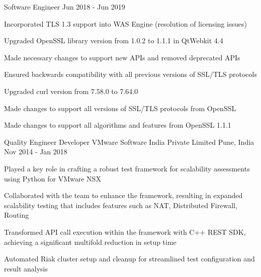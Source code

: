 \begin{cventries}
\cventry
{Software Engineer} %
{} %
{} %
{Jun 2018 - Jun 2019} %
{
\begin{cvitems}
\setlength{\itemsep}{1ex} %
%
\item {Incorporated TLS 1.3 support into WAS Engine (resolution of licensing issues)}
	\begin{cvitemsnested}
		\item {Upgraded OpenSSL library version from 1.0.2 to 1.1.1 in QtWebkit 4.4}
		\item {Made necessary changes to support new APIs and removed deprecated APIs}
		\item {Ensured backwards compatibility with all previous versions of SSL/TLS protocols}
	\end{cvitemsnested}
\item {Upgraded curl version from 7.58.0 to 7.64.0}
	\begin{cvitemsnested}
		\item {Made changes to support all versions of SSL/TLS protocols from OpenSSL}
		\item {Made changes to support all algorithms and features from OpenSSL 1.1.1}
	\end{cvitemsnested}
%
\end{cvitems}
}


\cventry
{Quality Engineer Developer} %
{VMware Software India Private Limited} %
{Pune, India} %
{Nov 2014 - Jan 2018} %
{ %
\begin{cvitems}
\item {Played a key role in crafting a robust test framework for scalability assessments using Python for VMware NSX}
\item {Collaborated with the team to enhance the framework, resulting in expanded scalability testing that includes features such as NAT, Distributed Firewall, Routing}
\item {Transformed API call execution within the framework with C++ REST SDK, achieving a significant multifold reduction in setup time}
\item {Automated Riak cluster setup and cleanup for streamlined test configuration and result analysis}
\end{cvitems}
}


\end{cventries}
